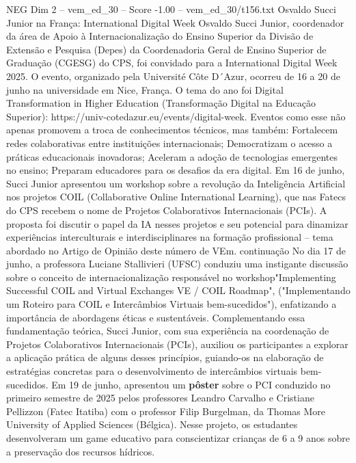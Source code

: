 \begin{textsample}{NEG Dim 2 – vem\_ed\_30 – Score -1.00 – vem\_ed\_30/t156.txt}  \label{ex:f2_neg_019}
Osvaldo Succi Junior na França: International Digital Week Osvaldo Succi Junior, coordenador da área de Apoio à Internacionalização do Ensino Superior da Divisão de Extensão e Pesquisa (Depes) da Coordenadoria Geral de Ensino Superior de Graduação (CGESG) do CPS, foi convidado para a International Digital Week 2025.
O evento, organizado pela Université Côte D´Azur, ocorreu de 16 a 20 de junho na universidade em Nice, França.
O tema do ano foi Digital Transformation in Higher Education (Transformação Digital na Educação Superior): https://univ-cotedazur.eu/events/digital-week.
Eventos como esse não apenas promovem a troca de conhecimentos técnicos, mas também: Fortalecem redes colaborativas entre instituições internacionais; Democratizam o acesso a práticas educacionais inovadoras; Aceleram a adoção de tecnologias emergentes no ensino; Preparam educadores para os desafios da era digital.
Em 16 de junho, Succi Junior apresentou um workshop sobre a revolução da Inteligência Artificial nos projetos COIL (Collaborative Online International Learning), que nas Fatecs do CPS recebem o nome de Projetos Colaborativos Internacionais (PCIs).
A proposta foi discutir o papel da IA nesses projetos e seu potencial para dinamizar experiências interculturais e interdisciplinares na formação profissional – tema abordado no Artigo de Opinião deste número de VEm. continuação No dia 17 de junho, a professora Luciane Stallivieri (UFSC) conduziu uma instigante discussão sobre o conceito de internacionalização responsável no workshop"Implementing Successful COIL and Virtual Exchanges VE / COIL Roadmap", ("Implementando um Roteiro para COIL e Intercâmbios Virtuais bem-sucedidos"), enfatizando a importância de abordagens éticas e sustentáveis.
Complementando essa fundamentação teórica, Succi Junior, com sua experiência na coordenação de Projetos Colaborativos Internacionais (PCIs), auxiliou os participantes a explorar a aplicação prática de alguns desses princípios, guiando-os na elaboração de estratégias concretas para o desenvolvimento de intercâmbios virtuais bem-sucedidos.
Em 19 de junho, apresentou um \textbf{pôster} sobre o PCI conduzido no primeiro semestre de 2025 pelos professores Leandro Carvalho e Cristiane Pellizzon (Fatec Itatiba) com o professor Filip Burgelman, da Thomas More University of Applied Sciences (Bélgica).
Nesse projeto, os estudantes desenvolveram um game educativo para conscientizar crianças de 6 a 9 anos sobre a preservação dos recursos hídricos.

\end{textsample}
